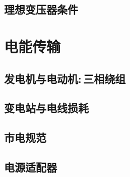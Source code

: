 \subsection{理想变压器条件}


\section{电能传输}

\subsection{发电机与电动机:\,三相绕组}

\subsection{变电站与电线损耗}

\subsection{市电规范}

\subsection{电源适配器}
